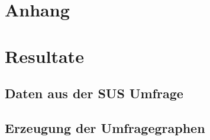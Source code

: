 \section{Anhang}

\section*{Resultate}

\subsection*{Daten aus der SUS Umfrage}



\subsection*{Erzeugung der Umfragegraphen}


